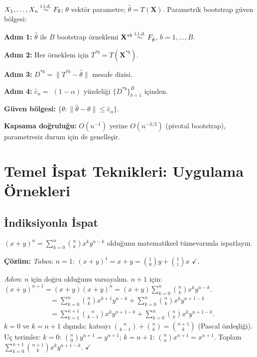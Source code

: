 \begin{ornek}
$X_1,\ldots,X_n\overset{\text{i.i.d.}}{\sim} F_\theta$; $\theta$ vektör parametre; $\hat\theta=T(\mathbf{X})$.
Parametrik bootstrap güven bölgesi:

\textbf{Adım 1:} $\hat\theta$ ile $B$ bootstrap örneklemi $\mathbf{X}^{*b}\overset{\text{i.i.d.}}{\sim} F_{\hat\theta}$, $b=1,\ldots,B$.

\textbf{Adım 2:} Her örneklem için $T^{*b}=T(\mathbf{X}^{*b})$.

\textbf{Adım 3:} $D^{*b}=\|T^{*b}-\hat\theta\|$ mesafe dizisi.

\textbf{Adım 4:} $\hat c_\alpha=$ $(1-\alpha)$ yüzdeliği $\{D^{*b}\}_{b=1}^B$ içinden.

\textbf{Güven bölgesi:} $\{\theta:\|\hat\theta-\theta\|\leq\hat c_\alpha\}$.

\textbf{Kapsama doğruluğu:} $O(n^{-1})$ yerine $O(n^{-3/2})$ (pivotal bootstrap), parametresiz durum için de genelleşir.
\end{ornek}

\section{Temel İspat Teknikleri: Uygulama Örnekleri}
\label{app:ispat_ornekler}

\subsection{İndiksiyonla İspat}

\begin{ornek}
$(x+y)^n = \sum_{k=0}^n \binom{n}{k}x^k y^{n-k}$ olduğunu matematiksel tümevarımla ispatlayın.

\textbf{Çözüm:}
\emph{Taban}: $n=1$: $(x+y)^1=x+y=\binom{1}{0}y+\binom{1}{1}x$ $\checkmark$.

\emph{Adım}: $n$ için doğru olduğunu varsayalım. $n+1$ için:
$(x+y)^{n+1}=(x+y)(x+y)^n=(x+y)\sum_{k=0}^n\binom{n}{k}x^k y^{n-k}$.
\begin{align*}
&= \sum_{k=0}^n\binom{n}{k}x^{k+1}y^{n-k}+\sum_{k=0}^n\binom{n}{k}x^k y^{n+1-k}\\
&= \sum_{k=1}^{n+1}\binom{n}{k-1}x^k y^{n+1-k}+\sum_{k=0}^n\binom{n}{k}x^k y^{n+1-k}.
\end{align*}
$k=0$ ve $k=n+1$ dışında: katsayı $\binom{n}{k-1}+\binom{n}{k}=\binom{n+1}{k}$ (Pascal özdeşliği). Uç terimler: $k=0$: $\binom{n}{0}y^{n+1}=y^{n+1}$; $k=n+1$: $\binom{n}{n}x^{n+1}=x^{n+1}$. Toplam $\sum_{k=0}^{n+1}\binom{n+1}{k}x^k y^{n+1-k}$. $\checkmark$
\end{ornek}

